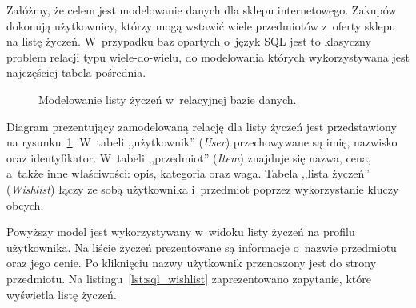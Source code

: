 Załóżmy, że celem jest modelowanie danych dla sklepu internetowego. Zakupów dokonują użytkownicy, którzy mogą wstawić wiele przedmiotów z~oferty sklepu na listę życzeń. W~przypadku baz opartych o~język SQL jest to klasyczny problem relacji typu wiele-do-wielu, do modelowania których wykorzystywana jest najczęściej tabela pośrednia. 

\begin{figure}[ht!]
	\centering

	\caption{Modelowanie listy życzeń w~relacyjnej bazie danych.}
	\label{fig:er_wishlist}
\end{figure}

Diagram prezentujący zamodelowaną relację dla listy życzeń jest przedstawiony na rysunku~\ref{fig:er_wishlist}. W~tabeli ,,użytkownik'' (\emph{User}) przechowywane są imię, nazwisko oraz identyfikator. W~tabeli ,,przedmiot'' (\emph{Item}) znajduje się nazwa, cena, a~także inne właściwości: opis, kategoria oraz waga. Tabela ,,lista życzeń'' (\emph{Wishlist}) łączy ze sobą użytkownika i~przedmiot poprzez wykorzystanie kluczy obcych. 

Powyższy model jest wykorzystywany w~widoku listy życzeń na profilu użytkownika. Na liście życzeń prezentowane są informacje o~nazwie przedmiotu oraz jego cenie. Po kliknięciu nazwy użytkownik przenoszony jest do strony przedmiotu. Na listingu~\ref{lst:sql_wishlist} zaprezentowano zapytanie, które wyświetla listę życzeń.

